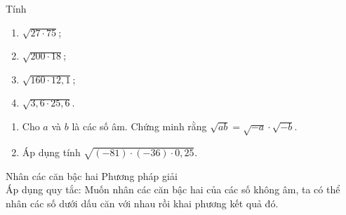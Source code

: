 \begin{vd}
    Tính
    \begin{multicols}{2}
    	\begin{enumerate}
    		\item $\sqrt{27\cdot 75}$;
    		\item $\sqrt{200\cdot 18}$;
    		\item $\sqrt{160\cdot 12{,}1}$;
    		\item $\sqrt{3{,}6\cdot 25{,}6}$.
    	\end{enumerate}
    \end{multicols}
\end{vd}
\begin{vd}
	\begin{enumerate}
		\item Cho $a$ và $b$ là các số âm. Chứng minh rằng $\sqrt{ab}=\sqrt{-a}\cdot \sqrt{-b}$.
		\item Áp dụng tính $\sqrt{(-81)\cdot (-36)\cdot 0{,}25}$.
	\end{enumerate}
\end{vd}

\begin{dang}{Nhân các căn bậc hai}
    Phương pháp giải\\
    Áp dụng quy tắc: Muốn nhân các căn bậc hai của các số không âm, ta có thể nhân các số dưới dấu căn với nhau rồi khai phương kết quả đó.
\end{dang}

